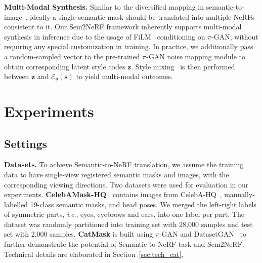 \documentclass[runningheads]{llncs}
\newcommand{\ie}{\textit{i}.\textit{e}.}
\begin{document}
\noindent\textbf{Multi-Modal Synthesis.} Similar to the diversified mapping in semantic-to-image~\cite{park2019semantic}, ideally a single semantic mask should be translated into multiple NeRFs consistent to it. Our Sem2NeRF framework inherently supports multi-modal synthesis in inference due to the usage of FiLM~\cite{perez2018film} conditioning on $\pi$-GAN, without requiring any special customization in training. In practice, we additionally pass a random-sampled vector to the pre-trained $\pi$-GAN noise mapping module to obtain corresponding latent style codes $\bm{z}$. Style mixing~\cite{richardson2021encoding,karras2019style} is then performed between $\bm{z}$ and $\mathcal{E}_\theta(\mathbf{s})$ to yield multi-modal outcomes.

\section{Experiments}

\subsection{Settings}\label{sec:exp_set}



\textbf{Datasets.} To achieve Semantic-to-NeRF translation, we assume the training data to have single-view registered semantic masks and images, with the corresponding viewing directions. Two datasets were used for evaluation in our experiments.
\textbf{CelebAMask-HQ~\cite{lee2020maskgan}} contains images from CelebA-HQ~\cite{liu2015deep,karras2017progressive}, manually-labelled 19-class semantic masks, and head poses. We merged the left-right labels of symmetric parts, \ie, eyes, eyebrows and ears, into one label per part. The dataset was randomly partitioned into training set with 28,000 samples and test set with 2,000 samples.
\textbf{CatMask} is built using $\pi$-GAN and DatasetGAN~\cite{zhang2021datasetgan} to further demonstrate the potential of  Semantic-to-NeRF task and  Sem2NeRF. Technical details are elaborated in Section~\ref{sec:tech_cat}. 
\end{document}
